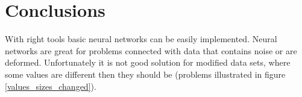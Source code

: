 \documentclass[a4paper, 11pt]{article}
\begin{document}

\section{Conclusions}
With right tools basic neural networks can be easily implemented. Neural networks are great for problems connected with data that contains noise or are deformed. Unfortunately it is not good solution for modified data sets, where some values are different then they should be (problems illustrated in figure \ref{values_sizes_changed}).



%

%

\end{document}
